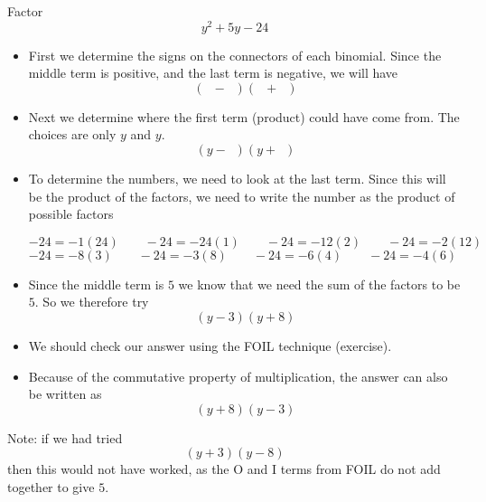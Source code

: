 \begin{myexample}\label{ex:factoring1}
Factor
\[
	y^2+5y-24
\]
{}
\end{myexample}
\begin{myProof}
	\begin{itemize}
		\item First we determine the signs on the connectors of each binomial. Since
		the middle term is positive, and the last term is negative, we will have
		\[
			(\phantom{x}-\phantom{x})(\phantom{x}+\phantom{x})
		\]
		\item Next we determine where the first term (product) could have come from. 
		The choices are only $y$ and $y$. 
		\[
			(y-\phantom{y})(y+\phantom{y})
		\]
		\item To determine the numbers, we need to look at the last term. Since this will
		be the product of the factors, we need to write the number as the product of possible
		factors
		\begin{tightcenter}
			$-24 = -1(24)\qquad -24=-24(1) \qquad -24=-12(2) \qquad -24=-2(12)$ \\
			$-24 = -8(3) \qquad -24=-3(8)\qquad -24=-6(4) \qquad -24 = -4(6)$
		\end{tightcenter}
		\item Since the middle term is $5$ we know that we need the sum of the factors to be $5$.
		So we therefore try
		\[
			(y-3)(y+8)
		\]
		\item We should check our answer using the FOIL technique (exercise).
		\item Because of the commutative property of multiplication, the answer can also be written as
		\[
			(y+8)(y-3)
		\]
	\end{itemize}
	Note: if we had tried
	\[
		(y+3)(y-8)
	\]
	then this would not have worked, as the O and I terms from FOIL do not add together to give $5$.
\end{myProof} 


